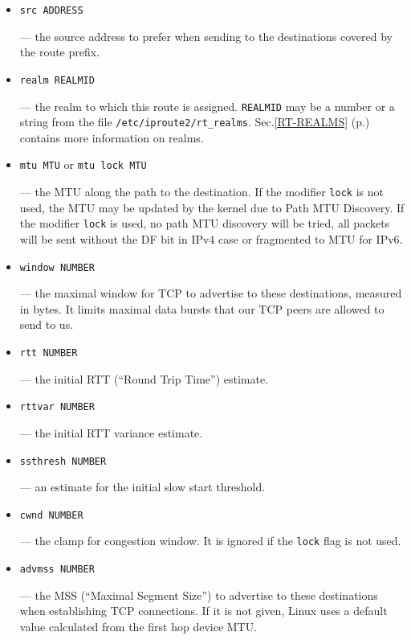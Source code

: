\begin{itemize}
\item \verb|src ADDRESS|

--- the source address to prefer when sending to the destinations
covered by the route prefix.

\item \verb|realm REALMID|

--- the realm to which this route is assigned.
\verb|REALMID| may be a number or a string from the file
\verb|/etc/iproute2/rt_realms|. Sec.\ref{RT-REALMS} (p.\pageref{RT-REALMS})
contains more information on realms.

\item \verb|mtu MTU| or \verb|mtu lock MTU|

--- the MTU along the path to the destination. If the modifier \verb|lock| is
not used, the MTU may be updated by the kernel due to Path MTU Discovery.
If the modifier \verb|lock| is used, no path MTU discovery will be tried,
all packets will be sent without the DF bit in IPv4 case
or fragmented to MTU for IPv6.

\item \verb|window NUMBER|

--- the maximal window for TCP to advertise to these destinations,
measured in bytes. It limits maximal data bursts that our TCP
peers are allowed to send to us.

\item \verb|rtt NUMBER|

--- the initial RTT (``Round Trip Time'') estimate.


\item \verb|rttvar NUMBER|

--- \threeonly the initial RTT variance estimate.


\item \verb|ssthresh NUMBER|

--- \threeonly an estimate for the initial slow start threshold.


\item \verb|cwnd NUMBER|

--- \threeonly the clamp for congestion window. It is ignored if the \verb|lock|
    flag is not used.


\item \verb|advmss NUMBER|

--- \threeonly the MSS (``Maximal Segment Size'') to advertise to these
    destinations when establishing TCP connections. If it is not given,
    Linux uses a default value calculated from the first hop device MTU.


\end{itemize}
